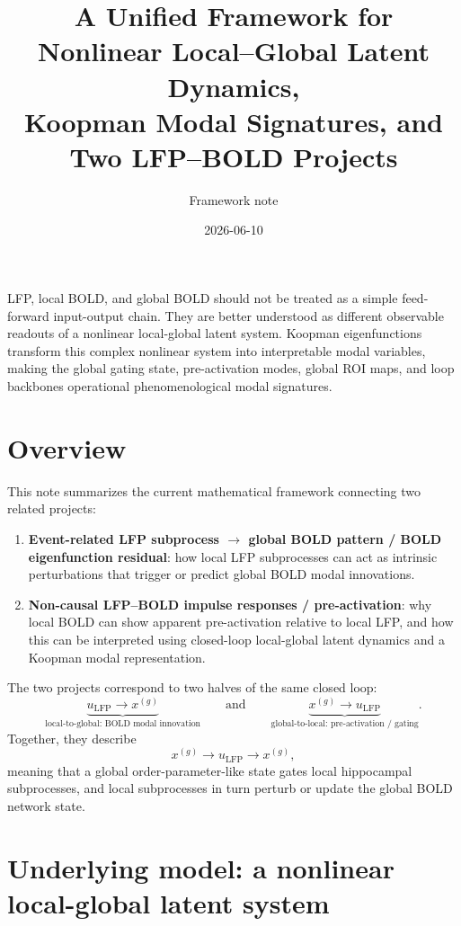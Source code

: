 \documentclass[11pt,a4paper]{article}
\title{A Unified Framework for Nonlinear Local--Global Latent Dynamics,\\ Koopman Modal Signatures, and Two LFP--BOLD Projects}
\author{Framework note}
\date{2026-06-10}
\begin{document}
\maketitle

\begin{tcolorbox}[colback=softblue,colframe=deepblue,title=Core idea]
LFP, local BOLD, and global BOLD should not be treated as a simple feed-forward input-output chain. They are better understood as different observable readouts of a nonlinear local-global latent system. Koopman eigenfunctions transform this complex nonlinear system into interpretable modal variables, making the global gating state, pre-activation modes, global ROI maps, and loop backbones operational phenomenological modal signatures.
\end{tcolorbox}

\tableofcontents
\newpage

\section{Overview}

This note summarizes the current mathematical framework connecting two related projects:
\begin{enumerate}
    \item \textbf{Event-related LFP subprocess $\to$ global BOLD pattern / BOLD eigenfunction residual}: how local LFP subprocesses can act as intrinsic perturbations that trigger or predict global BOLD modal innovations.
    \item \textbf{Non-causal LFP--BOLD impulse responses / pre-activation}: why local BOLD can show apparent pre-activation relative to local LFP, and how this can be interpreted using closed-loop local-global latent dynamics and a Koopman modal representation.
\end{enumerate}

The two projects correspond to two halves of the same closed loop:
\[
\underbrace{u_{\mathrm{LFP}} \rightarrow x^{(g)}}_{\text{local-to-global: BOLD modal innovation}}
\qquad\text{and}\qquad
\underbrace{x^{(g)} \rightarrow u_{\mathrm{LFP}}}_{\text{global-to-local: pre-activation / gating}}.
\]
Together, they describe
\[
x^{(g)} \rightarrow u_{\mathrm{LFP}} \rightarrow x^{(g)},
\]
meaning that a global order-parameter-like state gates local hippocampal subprocesses, and local subprocesses in turn perturb or update the global BOLD network state.

\section{Underlying model: a nonlinear local-global latent system}
\end{document}
